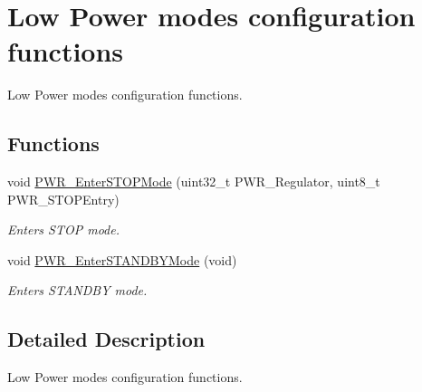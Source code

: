 \hypertarget{group___p_w_r___group6}{}\section{Low Power modes configuration functions}
\label{group___p_w_r___group6}


Low Power modes configuration functions.  


\subsection*{Functions}
\begin{DoxyCompactItemize}
\item 
void \hyperlink{group___p_w_r___group6_ga694676ac06a9baf50eae45adae0118ab}{P\+W\+R\+\_\+\+Enter\+S\+T\+O\+P\+Mode} (uint32\+\_\+t P\+W\+R\+\_\+\+Regulator, uint8\+\_\+t P\+W\+R\+\_\+\+S\+T\+O\+P\+Entry)
\begin{DoxyCompactList}\small\item\em Enters S\+T\+O\+P mode. \end{DoxyCompactList}\item 
void \hyperlink{group___p_w_r___group6_ga00ddae00a9c327b81b24d2597b0052f3}{P\+W\+R\+\_\+\+Enter\+S\+T\+A\+N\+D\+B\+Y\+Mode} (void)
\begin{DoxyCompactList}\small\item\em Enters S\+T\+A\+N\+D\+B\+Y mode. \end{DoxyCompactList}\end{DoxyCompactItemize}


\subsection{Detailed Description}
Low Power modes configuration functions. 


